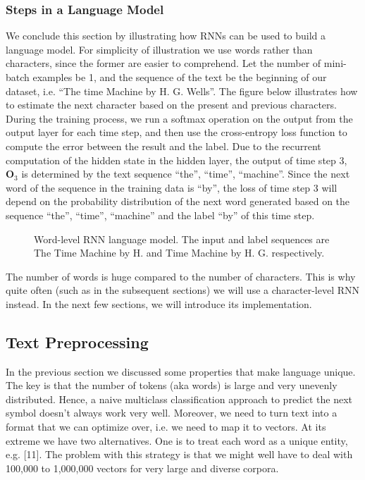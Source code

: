 \subsubsection{Steps in a Language Model}

We conclude this section by illustrating how RNNs can be used to build a language model. For simplicity of illustration we use words rather than characters, since the former are easier to comprehend. Let the number of mini-batch examples be 1, and the sequence of the text be the beginning of our dataset, i.e. “The time Machine by H. G. Wells”. The figure below illustrates how to estimate the next character based on the present and previous characters. During the training process, we run a softmax operation on the output from the output layer for each time step, and then use the cross-entropy loss function to compute the error between the result and the label. Due to the recurrent computation of the hidden state in the hidden layer, the output of time step 3, $\mathbf{O}_3$ is determined by the text sequence “the”, “time”, “machine”. Since the next word of the sequence in the training data is “by”, the loss of time step 3 will depend on the probability distribution of the next word generated based on the sequence “the”, “time”, “machine” and the label “by” of this time step.

\begin{figure}[hpt]
	\centering
	
	\caption{Word-level RNN language model. The input and label sequences are The Time Machine by H. and Time Machine by H. G. respectively.}
	\label{fig:rnn-train}
\end{figure}


The number of words is huge compared to the number of characters. This is why quite often (such as in the subsequent sections) we will use a character-level RNN instead. In the next few sections, we will introduce its implementation.

\subsection{Text Preprocessing}

In the previous section we discussed some properties that make language unique. The key is that the number of tokens (aka words) is large and very unevenly distributed. Hence, a naive multiclass classification approach to predict the next symbol doesn’t always work very well. Moreover, we need to turn text into a format that we can optimize over, i.e. we need to map it to vectors. At its extreme we have two alternatives. One is to treat each word as a unique entity, e.g. [11]. The problem with this strategy is that we might well have to deal with 100,000 to 1,000,000 vectors for very large and diverse corpora.

